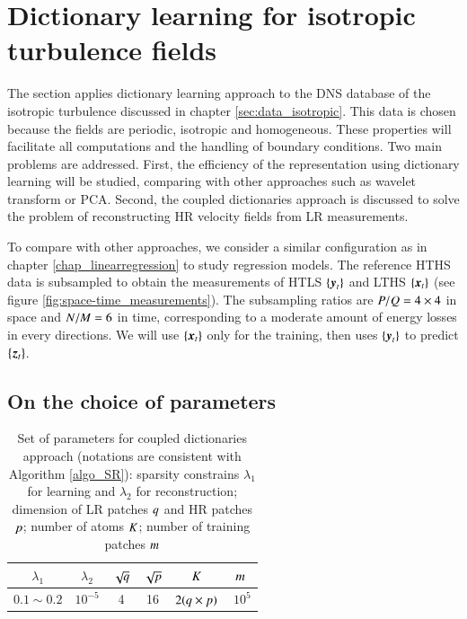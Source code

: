 \section{Dictionary learning for isotropic turbulence fields}
The section applies dictionary learning approach to the DNS database of the isotropic turbulence discussed in chapter \ref{sec:data_isotropic}. This data is chosen because the fields are periodic, isotropic and homogeneous. These properties will facilitate all computations and the handling of boundary conditions. Two main problems are addressed. First, the efficiency of the representation using dictionary learning will be studied, comparing with other approaches such as wavelet transform or PCA. Second, the coupled dictionaries approach is discussed to solve the problem of reconstructing HR velocity fields from LR measurements. 

To compare with other approaches, we consider a similar configuration as in chapter \ref{chap_linearregression} to study regression models. The reference HTHS data is subsampled to obtain the measurements of HTLS $ \{\operatorname{\boldsymbol{y}}_t\} $ and LTHS $ \{\operatorname{\boldsymbol{x}}_t\} $ (see figure \ref{fig:space-time_measurements}). The subsampling ratios are $ P/Q = 4 \times 4$ in space and $ N/M = 6 $ in time, corresponding to a moderate amount of energy losses in every directions. We will use $ \{\operatorname{\boldsymbol{x}}_t\} $ only for the training, then uses $ \{\operatorname{\boldsymbol{y}}_t\} $ to predict $ \{\operatorname{\boldsymbol{z}}_t\} $.

\subsection{On the choice of parameters}
\label{subsec:DL_choice_params}
\begin{table} 
	\caption{\label{tab:DLparams}
	Set of parameters for coupled dictionaries approach (notations are consistent with Algorithm \ref{algo_SR}): sparsity constrains $ \lambda_1 $ for learning and $ \lambda_2 $ for reconstruction; dimension of LR patches $ q $ and HR patches $ p $; number of atoms $ K $; number of training patches $ m $ }
	\vspace{.5cm}
	\centering
	\begin{tabular}{cccccc} 
		\toprule
		{$\lambda_1$} & {$\lambda_2$} & {$\sqrt{q}$} & {$\sqrt{p}$} & {$K$} & {$ m $} \\ 
		\midrule 
		$ 0.1 \sim 0.2 $  &  $ 10^{-5} $  & 4  & 16 & $ 2(q \times p) $ & $~ 10^5 $ \\ %
		\bottomrule
	\end{tabular}
\end{table}

